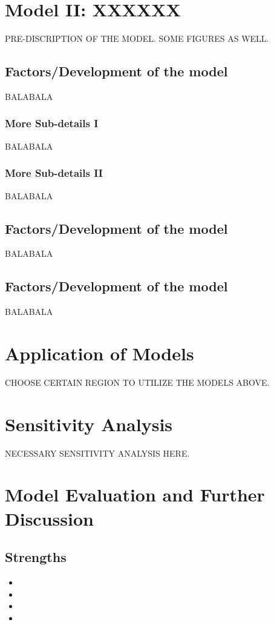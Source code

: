 \documentclass{mcmthesis}
\begin{document}
\section{Model II: XXXXXX}
PRE-DISCRIPTION OF THE MODEL. SOME FIGURES AS WELL.
\subsection{Factors/Development of the model}
BALABALA
\subsubsection{More Sub-details I}
BALABALA
\subsubsection{More Sub-details II}
BALABALA
\subsection{Factors/Development of the model}
BALABALA
\subsection{Factors/Development of the model}
BALABALA

\section{Application of Models}
CHOOSE CERTAIN REGION TO UTILIZE THE MODELS ABOVE.

\section{Sensitivity Analysis}
NECESSARY SENSITIVITY ANALYSIS HERE.

\section{Model Evaluation and Further Discussion}
\subsection{Strengths}
\begin{itemize}
	\item
	\item
	\item
	\item
\end{itemize}
\end{document}

